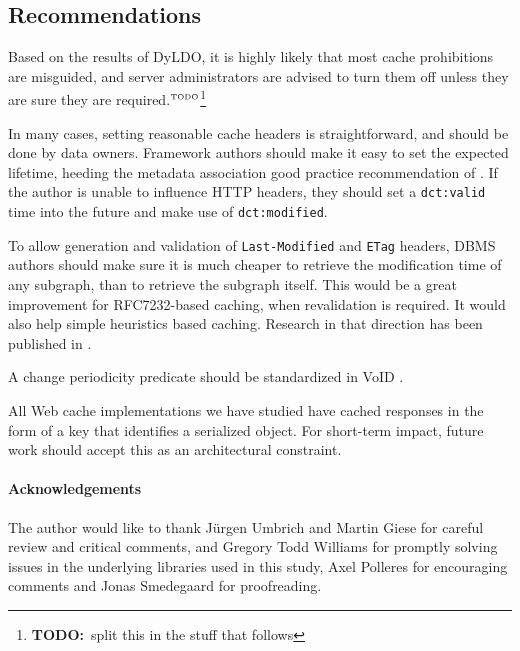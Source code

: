 \documentclass{llncs}
\newcommand{\rdfterm}[1]{\texttt{#1}}
\newcommand{\httph}[1]{\texttt{#1}}
\newcommand{\todo}[1]{\ensuremath{^{\textrm{\tiny{TODO}\normalsize}}}\footnote{\textbf{TODO:}~#1}}
\begin{document}
\subsection{Recommendations}

Based on the results of DyLDO, it is highly likely that most cache
prohibitions are misguided, and server administrators are advised to
turn them off unless they are sure they are required.\todo{split this
  in the stuff that follows}

In many cases, setting reasonable cache headers is straightforward,
and should be done by data owners. Framework authors should make it
easy to set the expected lifetime, heeding the metadata association
good practice recommendation of \cite{Jacobs:04:AWW}. If the author is
unable to influence HTTP headers, they should set a
\rdfterm{dct:valid} time into the future and make use of
\rdfterm{dct:modified}.

To allow generation and validation of \httph{Last-Modified} and
\httph{ETag} headers, DBMS authors should make sure it is much cheaper
to retrieve the modification time of any subgraph, than to retrieve
the subgraph itself. This would be a great improvement for
RFC7232-based caching, when revalidation is required. It would also
help simple heuristics based caching. Research in that direction has
been published in \cite{kaseicache}.

A change periodicity predicate should be standardized in VoID \cite{voidnote}.

All Web cache implementations we have studied have cached responses in
the form of a key that identifies a serialized object. For short-term
impact, future work should accept this as an architectural constraint.

\paragraph*{Acknowledgements} The author would like to thank Jürgen
Umbrich and Martin Giese for careful review and critical comments, and
Gregory Todd Williams for promptly solving issues in the underlying
libraries used in this study, Axel Polleres for encouraging comments
and Jonas Smedegaard for proofreading.


%
%
%

\end{document}
